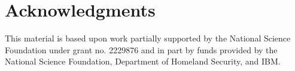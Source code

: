 \section{Acknowledgments}
This material is based upon work partially supported by the National Science Foundation under grant no. 2229876 and in part by funds provided by the National Science Foundation, Department of Homeland Security, and IBM. 